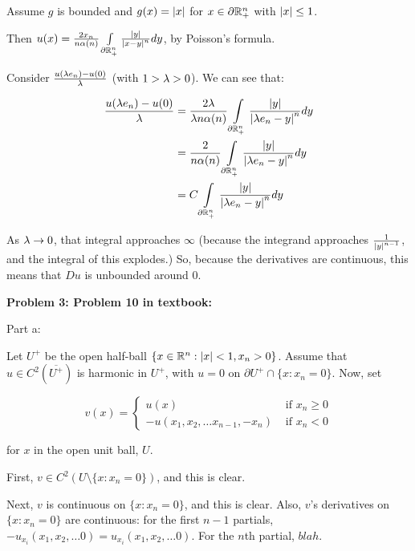 \documentclass[a4paper,12pt]{article}
\begin{document}
Assume $g$ is bounded and $g(x) = \left\lvert x \right\rvert$ for $x \in \partial \mathbb{R}_+^n$ with $\left\lvert x \right\rvert\leq 1$.

Then $u(x) = \frac{2x_n}{n\alpha(n)} \int\limits_{\partial \mathbb{R}^n_+} \frac{\left\lvert y \right\rvert}{\left\lvert x-y \right\rvert^n} dy$, by Poisson's formula.

Consider $\frac{u(\lambda e_n) - u(0)}{\lambda}$ (with $1> \lambda >0$). We can see that:

\begin{align*}
\frac{u(\lambda e_n) - u(0)}{\lambda} &= \frac{2\lambda}{\lambda n\alpha(n)} \int\limits_{\partial \mathbb{R}^n_+} \frac{\left\lvert y \right\rvert}{\left\lvert \lambda e_n-y \right\rvert^n} dy\\
&= \frac{2}{n\alpha(n)} \int\limits_{\partial \mathbb{R}^n_+} \frac{\left\lvert y \right\rvert}{\left\lvert \lambda e_n-y \right\rvert^n} dy\\
&= C \int\limits_{\partial \mathbb{R}^n_+} \frac{\left\lvert y \right\rvert}{\left\lvert \lambda e_n-y \right\rvert^n} dy\\
\end{align*}

As $\lambda \to 0$, that integral approaches $\infty$ (because the integrand approaches $\frac{1}{\left\lvert y \right\rvert^{n-1}}$, and the integral of this explodes.) So, because the derivatives are continuous, this means that $Du$ is unbounded around $0$. 

\shunt

{\bf Problem 3: Problem 10 in textbook:}

Part a:

Let $U^+$ be the open half-ball $\{ x \in \mathbb{R}^n : \left\lvert x \right\rvert < 1, x_n > 0\}$. Assume that $u \in C^2(\overline{U^+})$ is harmonic in $U^+$, with $u = 0$ on $\partial U^+ \cap \{x: x_n = 0\}$. Now, set

\begin{displaymath}
v(x) =
   \left\{
     \begin{array}{lr}
       u(x) & \text{ if } x_n \geq 0\\
       -u(x_1,x_2, \ldots x_{n-1}, -x_n) & \text{ if } x_n < 0
     \end{array}
   \right.
\end{displaymath}

for $x$ in the open unit ball, $U$.

First, $v \in C^2( U \setminus \{x: x_n = 0\})$, and this is clear.

Next, $v$ is continuous on $\{x: x_n = 0\}$, and this is clear. Also, $v$'s derivatives on $\{x: x_n = 0\}$ are continuous: for the first $n-1$ partials, $-u_{x_i}(x_1,x_2, \ldots 0) = u_{x_i}(x_1,x_2, \ldots 0)$. For the $n$th partial, $blah$. %
\end{document}
